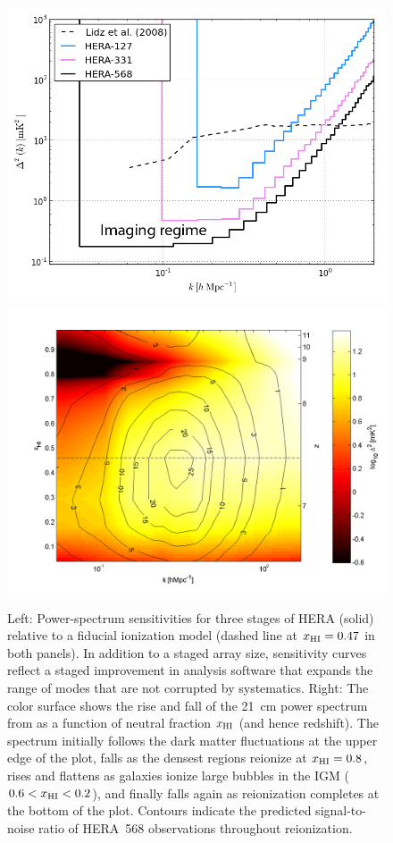 \documentclass[preprint]{aastex}
\def\HI{{H{\small I }}}
\def\xHI{{x_{\rm\HI}}}
\begin{document}
\begin{figure}[t]\centering
\includegraphics[height=2.40 in]{plots/eor_pspec.png}
\includegraphics[height=2.45 in]{plots/hera_snr_contour.png}
\caption{\small 
Left: Power-spectrum sensitivities for three stages of
HERA (solid) relative to a fiducial ionization model (dashed line at $\xHI=0.47$ in both panels).  
In addition
to a staged array size, sensitivity curves reflect
a staged improvement in analysis software that expands the range
of modes that are not corrupted by systematics. 
Right: The color surface shows the rise and fall of the 21~cm power spectrum from 
\citealt{lidz_et_al2008} as a function of neutral fraction $\xHI$ (and hence redshift).
The spectrum initially follows the dark matter fluctuations at the upper edge
of the plot, falls as the densest regions reionize at $\xHI=0.8$, rises and flattens as galaxies ionize large bubbles in the IGM
($0.6<\xHI<0.2$), and finally
falls again as reionization completes at the bottom of the
plot. Contours indicate the predicted signal-to-noise ratio of HERA~568 observations
throughout reionization.
}\label{fig:eor_pspec} 
\end{figure}
\end{document}
